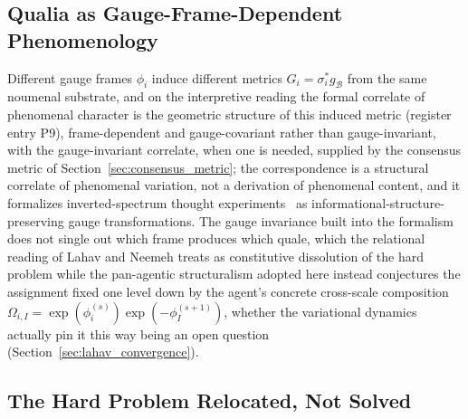 \documentclass[11pt]{article}
\begin{document}
\subsection{Qualia as Gauge-Frame-Dependent Phenomenology}

Different gauge frames $\phi_i$ induce different metrics $G_i = \sigma_i^* g_{\mathcal{B}}$ from the same noumenal substrate, and on the interpretive reading the formal correlate of phenomenal character is the geometric structure of this induced metric (register entry P9), frame-dependent and gauge-covariant rather than gauge-invariant, with the gauge-invariant correlate, when one is needed, supplied by the consensus metric of Section~\ref{sec:consensus_metric}; the correspondence is a structural correlate of phenomenal variation, not a derivation of phenomenal content, and it formalizes inverted-spectrum thought experiments~\cite{Shoemaker1982} as informational-structure-preserving gauge transformations. The gauge invariance built into the formalism does not single out which frame produces which quale, which the relational reading of Lahav and Neemeh treats as constitutive dissolution of the hard problem while the pan-agentic structuralism adopted here instead conjectures the assignment fixed one level down by the agent's concrete cross-scale composition $\Omega_{i,I} = \exp(\phi_i^{(s)})\exp(-\phi_I^{(s+1)})$, whether the variational dynamics actually pin it this way being an open question (Section~\ref{sec:lahav_convergence}).

\subsection{The Hard Problem Relocated, Not Solved}
\end{document}
